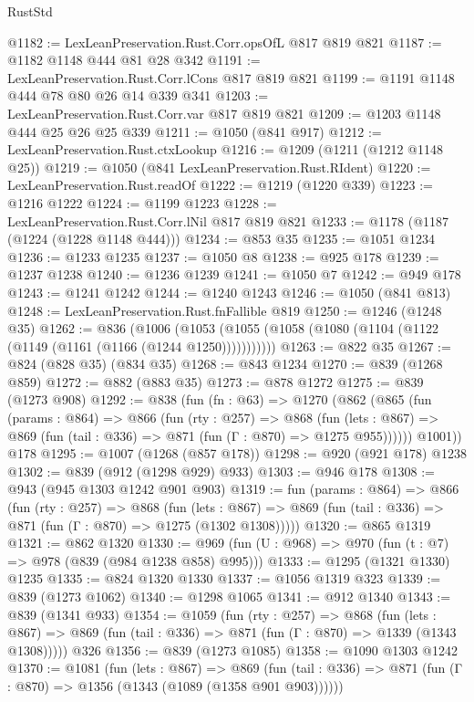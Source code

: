 \begin{lexlean}{RustStd}
\begin{coremodule}
{\begin{coremodule}
{{{{{{{{@1182 := LexLeanPreservation.Rust.Corr.opsOfL @817 @819 @821
@1187 := @1182 @1148 @444 @81 @28 @342
@1191 := LexLeanPreservation.Rust.Corr.lCons @817 @819 @821
@1199 := @1191 @1148 @444 @78 @80 @26 @14 @339 @341
@1203 := LexLeanPreservation.Rust.Corr.var @817 @819 @821
@1209 := @1203 @1148 @444 @25 @26 @25 @339
@1211 := @1050 (@841 @917)
@1212 := LexLeanPreservation.Rust.ctxLookup
@1216 := @1209 (@1211 (@1212 @1148 @25))
@1219 := @1050 (@841 LexLeanPreservation.Rust.RIdent)
@1220 := LexLeanPreservation.Rust.readOf
@1222 := @1219 (@1220 @339)
@1223 := @1216 @1222
@1224 := @1199 @1223
@1228 := LexLeanPreservation.Rust.Corr.lNil @817 @819 @821
@1233 := @1178 (@1187 (@1224 (@1228 @1148 @444)))
@1234 := @853 @35
@1235 := @1051 @1234
@1236 := @1233 @1235
@1237 := @1050 @8
@1238 := @925 @178
@1239 := @1237 @1238
@1240 := @1236 @1239
@1241 := @1050 @7
@1242 := @949 @178
@1243 := @1241 @1242
@1244 := @1240 @1243
@1246 := @1050 (@841 @813)
@1248 := LexLeanPreservation.Rust.fnFallible @819
@1250 := @1246 (@1248 @35)
@1262 := @836
    (@1006 (@1053 (@1055 (@1058 (@1080 (@1104 (@1122 (@1149 (@1161 (@1166 (@1244 @1250)))))))))))
@1263 := @822 @35
@1267 := @824 (@828 @35) (@834 @35)
@1268 := @843 @1234
@1270 := @839 (@1268 @859)
@1272 := @882 (@883 @35)
@1273 := @878 @1272
@1275 := @839 (@1273 @908)
@1292 := @838
    (fun (fn : @63) =>
    @1270
      (@862
        (@865
          (fun (params : @864) =>
          @866
            (fun (rty : @257) =>
            @868
              (fun (lets : @867) =>
              @869 (fun (tail : @336) => @871 (fun (Γ : @870) => @1275 @955))))))
        @1001))
    @178
@1295 := @1007 (@1268 (@857 @178))
@1298 := @920 (@921 @178) @1238
@1302 := @839 (@912 (@1298 @929) @933)
@1303 := @946 @178
@1308 := @943 (@945 @1303 @1242 @901 @903)
@1319 := fun (params : @864) =>
  @866
    (fun (rty : @257) =>
    @868
      (fun (lets : @867) =>
      @869 (fun (tail : @336) => @871 (fun (Γ : @870) => @1275 (@1302 @1308)))))
@1320 := @865 @1319
@1321 := @862 @1320
@1330 := @969 (fun (U : @968) => @970 (fun (t : @7) => @978 (@839 (@984 @1238 @858) @995)))
@1333 := @1295 (@1321 @1330) @1235
@1335 := @824 @1320 @1330
@1337 := @1056 @1319 @323
@1339 := @839 (@1273 @1062)
@1340 := @1298 @1065
@1341 := @912 @1340
@1343 := @839 (@1341 @933)
@1354 := @1059
    (fun (rty : @257) =>
    @868
      (fun (lets : @867) =>
      @869 (fun (tail : @336) => @871 (fun (Γ : @870) => @1339 (@1343 @1308)))))
    @326
@1356 := @839 (@1273 @1085)
@1358 := @1090 @1303 @1242
@1370 := @1081
    (fun (lets : @867) =>
    @869 (fun (tail : @336) => @871 (fun (Γ : @870) => @1356 (@1343 (@1089 (@1358 @901 @903))))))
}}}}}}}}
\end{coremodule}}
\end{coremodule}
\end{lexlean}
